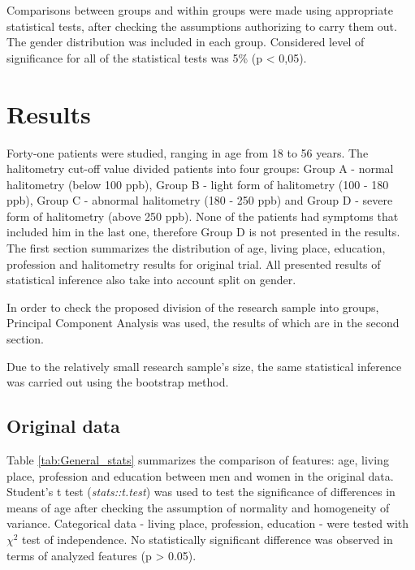 \documentclass[12pt,a4paper,notitlepage]{report}
\begin{document}
Comparisons between groups and within groups were made using appropriate statistical tests, after checking the assumptions authorizing to carry them out.
The gender distribution was included in each group. Considered level of significance for all of the statistical tests was 5\% (p < 0,05).



\chapter{Results}

Forty-one patients were studied, ranging in age from 18 to 56 years. The halitometry cut-off value divided patients into four groups: Group A - normal halitometry (below 100 ppb), Group B - light form of halitometry (100 - 180 ppb), Group C - abnormal halitometry (180 - 250 ppb) and Group D - severe form of halitometry (above 250 ppb). None of the patients had symptoms that included him in the last one, therefore Group D is not presented in the results. The first section summarizes the distribution of age, living place, education, profession and halitometry results for original trial. All presented results of statistical inference also take into account split on gender.

In order to check the proposed division of the research sample into groups, Principal Component Analysis was used, the results of which are in the second section.

Due to the relatively small research sample's size, the same statistical inference was carried out using the bootstrap method.

\section{Original data}

Table \ref{tab:General_stats} summarizes the comparison of features: age, living place, profession and education between men and women in the original data. Student's t test (\textit{stats::t.test}) was used to test the significance of differences in means of age after checking the assumption of normality and homogeneity of variance. 
Categorical data - living place, profession, education - were tested with $\chi^2 $ test of independence. 
No statistically significant difference was observed in terms of analyzed features (p > 0.05). 
\end{document}

